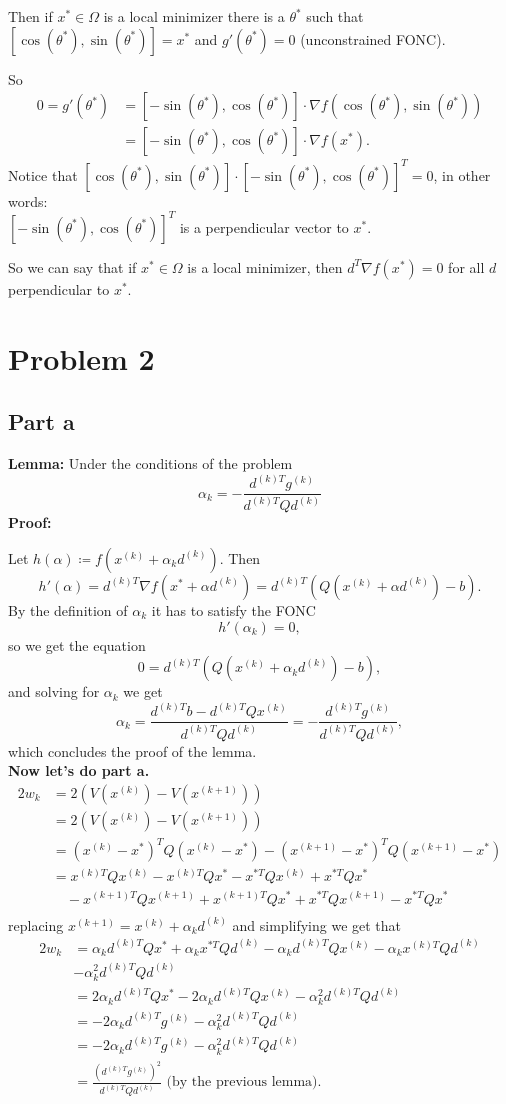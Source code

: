 \documentclass{article}
\begin{document}
Then if $x^*\in\Omega$ is a local minimizer there is a $\theta^*$ such
that\\
$[\cos(\theta^*),\sin(\theta^*)]=x^*$
and $g'(\theta^*)=0$ (unconstrained FONC).

So
\begin{align*}
0=
g'(\theta^*)
&=[-\sin(\theta^*),\cos(\theta^*)]\cdot
\nabla f(\cos(\theta^*),\sin(\theta^*))\\
&=[-\sin(\theta^*),\cos(\theta^*)]\cdot
\nabla f(x^*).
\end{align*}
Notice that
$[\cos(\theta^*),\sin(\theta^*)]\cdot[-\sin(\theta^*),\cos(\theta^*)]^T=0$, in
other words:\\
$[-\sin(\theta^*),\cos(\theta^*)]^T$ is a perpendicular vector to
$x^*$.

So we can say that if $x^*\in\Omega$ is a local minimizer, then $d^T\nabla
f(x^*)=0$ for all $d$ perpendicular to $x^*$.
\section*{Problem 2}
\subsection*{Part a}
\textbf{Lemma:} Under the conditions of the problem
\[
\alpha_k = -\frac{d^{(k)T}g^{(k)}}{d^{(k)T}Qd^{(k)}}
\]
\textbf{Proof:}

Let $h(\alpha)\coloneq f(x^{(k)}+\alpha_kd^{(k)})$. Then
\[
	h'(\alpha)=d^{(k)T}\nabla f(x^*+\alpha d^{(k)})
	=d^{(k)T}(Q(x^{(k)}+\alpha d^{(k)})-b).
\]
By the definition of $\alpha_k$ it has to satisfy the FONC
\[
	h'(\alpha_k)=0,
\]
so we get the equation
\[
0=d^{(k)T}(Q(x^{(k)}+\alpha_k d^{(k)})-b),
\]
and solving for $\alpha_k$ we get
\[
	\alpha_k=\frac{d^{(k)T}b-d^{(k)T}Qx^{(k)}}{d^{(k)T}Qd^{(k)}}=-\frac{d^{(k)T}g^{(k)}}{d^{(k)T}Qd^{(k)}},
\]
which concludes the proof of the lemma.\\
\textbf{Now let's do part a.}
\begin{align*}
2w_k
&= 2(V(x^{(k)})-V(x^{(k+1)}))\\
&= 2(V(x^{(k)})-V(x^{(k+1)}))\\
&=(x^{(k)}-x^*)^TQ(x^{(k)}-x^*)
-(x^{(k+1)}-x^*)^TQ(x^{(k+1)}-x^*)\\
&=x^{(k)T}Qx^{(k)}-x^{(k)T}Qx^*-x^{*T}Qx^{(k)}+x^{*T}Qx^*\\
&\quad-x^{(k+1)T}Qx^{(k+1)}+x^{(k+1)T}Qx^*+x^{*T}Qx^{(k+1)}-x^{*T}Qx^*\\
\end{align*}
replacing $x^{(k+1)}=x^{(k)}+\alpha_k d^{(k)}$ and simplifying we get that
\begin{align*}
2w_k&= \alpha_k d^{(k)T}Qx^*+\alpha_k x^{*T}Qd^{(k)}
-\alpha_k d^{(k)T}Qx^{(k)}-\alpha_k x^{(k)T}Qd^{(k)}\\
&-\alpha_k^2d^{(k)T}Qd^{(k)}\\
&=2\alpha_k d^{(k)T}Qx^*-2\alpha_k d^{(k)T}Qx^{(k)}-\alpha_k^2d^{(k)T}Qd^{(k)}\\
&=-2\alpha_k d^{(k)T}g^{(k)}-\alpha_k^2d^{(k)T}Qd^{(k)}\\
&=-2\alpha_k d^{(k)T}g^{(k)}-\alpha_k^2d^{(k)T}Qd^{(k)}\\
&=\frac{(d^{(k)T}g^{(k)})^2}{d^{(k)T}Qd^{(k)}} \text{ (by the previous lemma).}
\end{align*}
\end{document}

